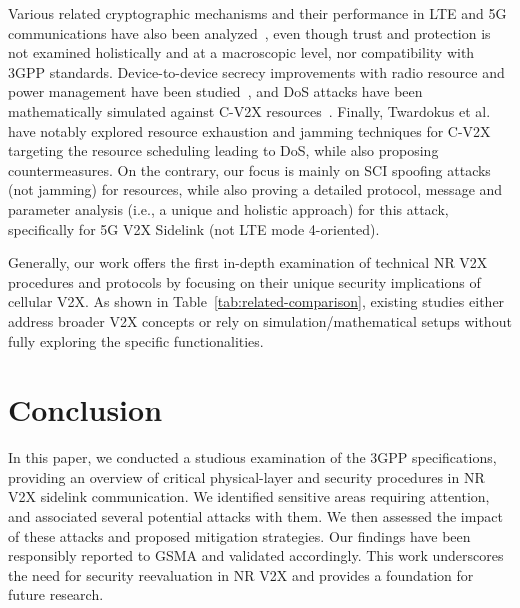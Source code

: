 Various related cryptographic mechanisms and their performance in LTE and 5G communications have also been analyzed~\cite{Pizzi21securedelivery, Zhang15SeDS, Suraci21d2d, Ahmed18secure, Liu21plattoning, Alnasser20trust}, even though trust and protection is not examined holistically and at a macroscopic level, nor compatibility with 3GPP standards. Device-to-device secrecy improvements with radio resource and power management have been studied~\cite{Yiliang20secrecy}, and DoS attacks have been mathematically simulated against C-V2X resources~\cite{Trkulja20DenialofServiceAO}. Finally, Twardokus et al.~\cite{Twardokus22dos, Twardokus23dos} have notably explored resource exhaustion and jamming techniques for C-V2X targeting the resource scheduling leading to DoS, while also proposing countermeasures. On the contrary, our focus is mainly on SCI spoofing attacks (not jamming) for resources, while also proving a detailed protocol, message and parameter analysis (i.e., a unique and holistic approach) for this attack, specifically for 5G V2X Sidelink (not LTE mode 4-oriented).

Generally, our work offers the first in-depth examination of technical NR V2X procedures and protocols by focusing on their unique security implications of cellular V2X. As shown in Table~\ref{tab:related-comparison}, existing studies either address broader V2X concepts or rely on simulation/mathematical setups without fully exploring the specific functionalities.

\section{Conclusion} \label{sec:conclusion}

In this paper, we conducted a studious examination of the 3GPP specifications, providing an overview of critical physical-layer and security procedures in NR V2X sidelink communication. We identified sensitive areas requiring attention, and associated several potential attacks with them. We then assessed the impact of these attacks and proposed mitigation strategies. Our findings have been responsibly reported to GSMA and validated accordingly. This work underscores the need for security reevaluation in NR V2X and provides a foundation for future research.